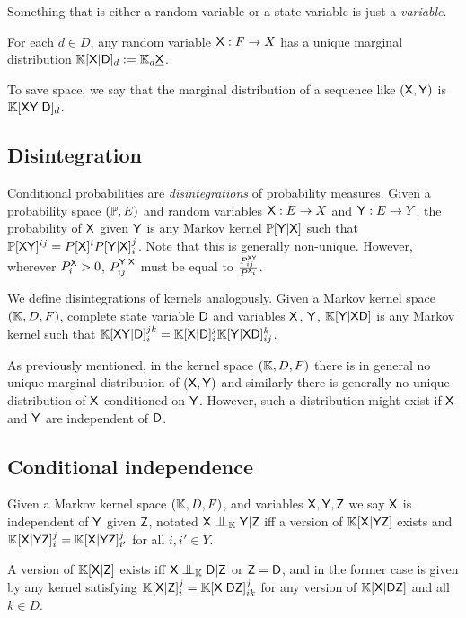 Something that is either a random variable or a state variable is just a \emph{variable}.

For each $d\in D$, any random variable $\mathsf{X}:F\to X$ has a unique marginal distribution $\mathbb{K}[\mathsf{X}|\mathsf{D}]_d:=\mathbb{K}_d\underline{\mathsf{X}}$. 

To save space, we say that the marginal distribution of a sequence like $(\mathsf{X},\mathsf{Y})$ is $\mathbb{K}[\mathsf{XY}|\mathsf{D}]_d$.

\subsection{Disintegration}\label{ssec:disintegration}

Conditional probabilities are \emph{disintegrations} of probability measures. Given a probability space $(\mathbb{P},E)$ and random variables $\mathsf{X}:E\to X$ and $\mathsf{Y}:E\to Y$, the probability of $\mathsf{X}$ given $\mathsf{Y}$ is any Markov kernel $\mathbb{P}[\mathsf{Y}|\mathsf{X}]$ such that $\mathbb{P}[\mathsf{XY}]^{ij}= P[\mathsf{X}]^i P[\mathsf{Y}|\mathsf{X}]_i^j$. Note that this is generally non-unique. However, wherever $P^{\mathsf{X}}_i>0$, $P^{\mathsf{Y}|\mathsf{X}}_{ij}$ must be equal to $\frac{P^{\mathsf{XY}}_{ij}}{P^{\mathsf{X}_i}}$.

We define disintegrations of kernels analogously. Given a Markov kernel space $(\mathbb{K},D,F)$, complete state variable $\mathsf{D}$ and variables $\mathsf{X}$, $\mathsf{Y}$, $\mathbb{K}[\mathsf{Y}|\mathsf{X}\mathsf{D}]$ is any Markov kernel such that $\mathbb{K}[\mathsf{XY}|\mathsf{D}]_i^{jk} = \mathbb{K}[\mathsf{X}|\mathsf{D}]_{i}^j \mathbb{K}[\mathsf{Y}|\mathsf{X}\mathsf{D}]_{ij}^k$. 

As previously mentioned, in the kernel space $(\mathbb{K},D,F)$ there is in general no unique marginal distribution of $(\mathsf{X},\mathsf{Y})$ and similarly there is generally no unique distribution of $\mathsf{X}$ conditioned on $\mathsf{Y}$. However, such a distribution might exist if $\mathsf{X}$ and $\mathsf{Y}$ are independent of $\mathsf{D}$.

\subsection{Conditional independence}\label{ssec:cond_indep}

Given a Markov kernel space $(\mathbb{K}, D, F)$, and variables $\mathsf{X},\mathsf{Y}, \mathsf{Z}$ we say $\mathsf{X}$ is independent of $\mathsf{Y}$ given $\mathsf{Z}$, notated $\RV{X}\CI_{\kernel{K}} \RV{Y}|\RV{Z}$ iff a version of $\mathbb{K}[\mathsf{X}|\mathsf{YZ}]$ exists and $\mathbb{K}[\mathsf{X}|\mathsf{YZ}]_i^j = \mathbb{K}[\mathsf{X}|\mathsf{YZ}]_{i'}^j$ for all $i,i'\in Y$.

A version of $\mathbb{K}[\mathsf{X}|\mathsf{Z}]$ exists iff $\RV{X}\CI_{\kernel{K}} \RV{D}|\RV{Z}$ or $\mathsf{Z}=\mathsf{D}$, and in the former case is given by any kernel satisfying $\mathbb{K}[\mathsf{X}|\mathsf{Z}]_i^j = \mathbb{K}[{\mathsf{X}|\mathsf{DZ}}]_{ik}^j$ for any version of $\mathbb{K}[\mathsf{X}|\mathsf{DZ}]$ and all $k\in D$.